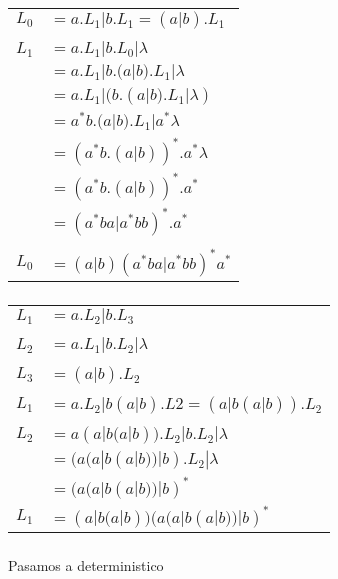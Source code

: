 \subsubsection{}
\begin{tabular}{l l}
$L_0$ & $= a.L_1 | b.L_1 = (a|b).L_1$ \\ \\

$L_1$ & $= a.L_1 | b.L_0 | \lambda$ \\
	  & $= a.L_1 | b.(a|b).L_1 | \lambda$ \\
	  & $= a.L_1 | (b.(a|b).L_1 | \lambda)$ \\
	  & $= a^*b.(a|b).L_1 | a^*\lambda$ \\
	  & $= (a^*b.(a|b))^*.a^*\lambda$ \\
	  & $= (a^*b.(a|b))^*.a^*$ \\
	  & $= (a^*ba|a^*bb)^*.a^*$ \\ \\

$L_0$ & $= (a|b)(a^*ba|a^*bb)^*a^*$ \\
\end{tabular}

\subsubsection{}
\begin{tabular}{l l}
$L_1$ & $= a.L_2 | b.L_3$ \\ \\

$L_2$ & $= a.L_1 | b.L_2 | \lambda$ \\ \\

$L_3$ & $= (a|b).L_2$ \\ \\

$L_1$ & $= a.L_2 | b(a|b).L2 = (a|b(a|b)).L_2$ \\ \\

$L_2$ & $= a(a|b(a|b)).L_2 | b.L_2 | \lambda$ \\
	  & $= (a(a|b(a|b))| b).L_2 | \lambda$ \\
	  & $= (a(a|b(a|b))| b)^*$ \\

$L_1$ & $= (a|b(a|b))(a(a|b(a|b))| b)^*$ \\
\end{tabular}

\subsubsection{}
Pasamos a deterministico \\


